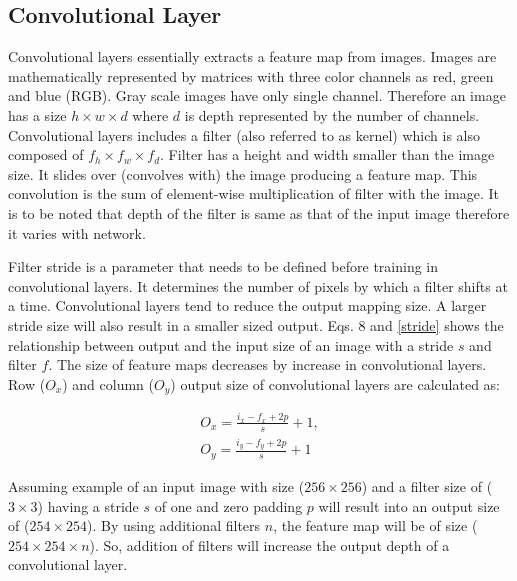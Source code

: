 \documentclass[11pt]{article}
\begin{document}
\subsection{Convolutional Layer}
Convolutional layers essentially extracts a feature map from images. Images are mathematically represented by matrices with three color channels as red, green and blue (RGB). Gray scale images have only single channel. Therefore an image has a size $h \times w \times d$ where $d$ is depth represented by the number of channels. Convolutional layers includes a filter (also referred to as kernel) which is also composed of $f_h \times f_w \times f_d$. Filter has a height and width smaller than the image size. It slides over (convolves with) the image producing a feature map. This convolution is the sum of element-wise multiplication of filter with the image. It is to be noted that depth of the filter is same as that of the input image therefore it varies with network.

Filter stride is a parameter that needs to be defined before training in convolutional layers. It determines the number of pixels by which a filter shifts at a time. Convolutional layers tend to reduce the output mapping size. A larger stride size will also result in a smaller sized output. Eqs. 8 and \ref{stride} shows the relationship between output and the input size of an image with a stride $s$ and filter $f$. The size of feature maps decreases by increase in convolutional layers. Row ($O_x$) and column ($O_y$) output size of convolutional layers are calculated as:

\begin{align}
O_{x}=\frac{i_{x}-f_{x} + 2p}{s}+1, \\
O_{y}=\frac{i_{y}-f_{y} + 2p}{s}+1
\label{stride}
\end{align} 

Assuming example of an input image with size ($256 \times 256$) and a filter size of ($3 \times 3$) having a stride $s$ of one and zero padding $p$ will result into an output size of ($254 \times 254$). By using additional filters $n$, the feature map will be of size ($254 \times 254 \times n$). So, addition of filters will increase the output depth of a convolutional layer.

\end{document}

